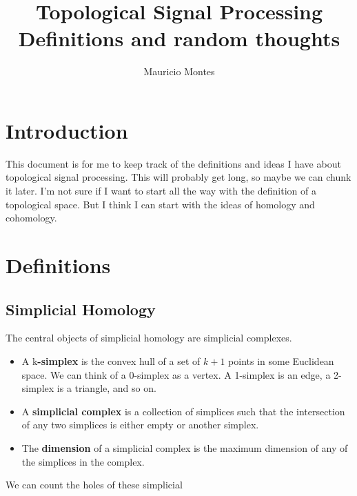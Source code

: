 \documentclass[12pt]{article}
\author{Mauricio Montes}
\title{Topological Signal Processing Definitions and random thoughts}
\begin{document}
\maketitle

\section{Introduction}

This document is for me to keep track of the definitions and ideas I have about topological signal
processing. This will probably get long, so maybe we can chunk it later. I'm not sure if I want to
start all the way with the definition of a topological space. But I think I can start with the ideas
of homology and cohomology. 

\section{Definitions}

\subsection{Simplicial Homology}

The central objects of simplicial homology are simplicial complexes.

\begin{itemize}

\item A k\textbf{-simplex} is the convex hull of a set of $k+1$ points in some Euclidean space. We can think of a 0-simplex as a
vertex. A 1-simplex is an edge, a 2-simplex is a triangle, and so on.


\item A \textbf{simplicial complex} is a collection of simplices such that the intersection of any two simplices is either empty or
another simplex.


\item The \textbf{dimension} of a simplicial complex is the maximum dimension of any of the simplices in the complex. 

\end{itemize}

We can count the holes of these simplicial 
\end{document}
